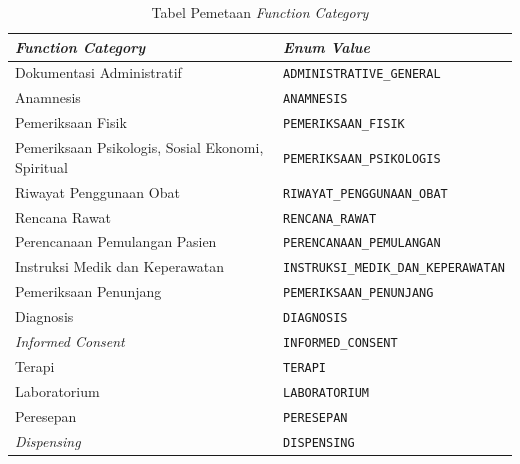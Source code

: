 \begin{table}[H]
	\centering
	\caption{Tabel Pemetaan \textit{Function Category}}
	\label{tab:mapping-function-category}
	\small
	\begin{tabular}{|p{}|p{}|}
		\hline
		\textbf{\textit{Function Category}} & \textbf{\textit{Enum Value}}                \\ \hline

		Dokumentasi Administratif
		                                    & \texttt{ADMINISTRATIVE\_GENERAL}
		\\ \hline

		Anamnesis
		                                    & \texttt{ANAMNESIS}
		\\ \hline

		Pemeriksaan Fisik
		                                    & \texttt{PEMERIKSAAN\_FISIK}
		\\ \hline

		Pemeriksaan Psikologis, Sosial Ekonomi, Spiritual
		                                    & \texttt{PEMERIKSAAN\_PSIKOLOGIS}
		\\ \hline

		Riwayat Penggunaan Obat
		                                    & \texttt{RIWAYAT\_PENGGUNAAN\_OBAT}
		\\ \hline

		Rencana Rawat
		                                    & \texttt{RENCANA\_RAWAT}
		\\ \hline

		Perencanaan Pemulangan Pasien
		                                    & \texttt{PERENCANAAN\_PEMULANGAN}
		\\ \hline

		Instruksi Medik dan Keperawatan
		                                    & \texttt{INSTRUKSI\_MEDIK\_DAN\_KEPERAWATAN}
		\\ \hline

		Pemeriksaan Penunjang
		                                    & \texttt{PEMERIKSAAN\_PENUNJANG}
		\\ \hline

		Diagnosis
		                                    & \texttt{DIAGNOSIS}
		\\ \hline

		\textit{Informed Consent}
		                                    & \texttt{INFORMED\_CONSENT}
		\\ \hline

		Terapi
		                                    & \texttt{TERAPI}
		\\ \hline

		Laboratorium
		                                    & \texttt{LABORATORIUM}
		\\ \hline

		Peresepan
		                                    & \texttt{PERESEPAN}
		\\ \hline

		\textit{Dispensing}
		                                    & \texttt{DISPENSING}
		\\ \hline
	\end{tabular}

\end{table}

